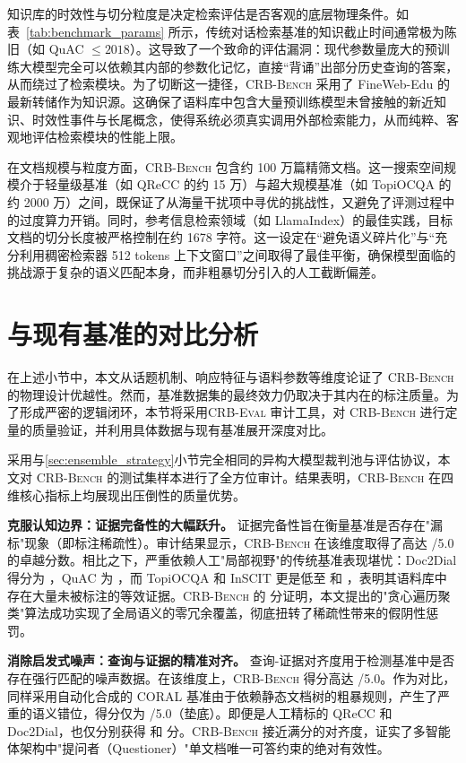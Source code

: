 知识库的时效性与切分粒度是决定检索评估是否客观的底层物理条件。如表~\ref{tab:benchmark_params} 所示，传统对话检索基准的知识截止时间通常极为陈旧（如 QuAC $\leq 2018$）。这导致了一个致命的评估漏洞：现代参数量庞大的预训练大模型完全可以依赖其内部的参数化记忆，直接“背诵”出部分历史查询的答案，从而绕过了检索模块。为了切断这一捷径，\textsc{CRB-Bench} 采用了 FineWeb-Edu 的最新转储作为知识源。这确保了语料库中包含大量预训练模型未曾接触的新近知识、时效性事件与长尾概念，使得系统必须真实调用外部检索能力，从而纯粹、客观地评估检索模块的性能上限。

在文档规模与粒度方面，\textsc{CRB-Bench} 包含约 100 万篇精筛文档。这一搜索空间规模介于轻量级基准（如 QReCC 的约 15 万）与超大规模基准（如 TopiOCQA 的约 2000 万）之间，既保证了从海量干扰项中寻优的挑战性，又避免了评测过程中的过度算力开销。同时，参考信息检索领域（如 LlamaIndex）的最佳实践，目标文档的切分长度被严格控制在约 1678 字符。这一设定在“避免语义碎片化”与“充分利用稠密检索器 512 tokens 上下文窗口”之间取得了最佳平衡，确保模型面临的挑战源于复杂的语义匹配本身，而非粗暴切分引入的人工截断偏差。


\section{与现有基准的对比分析}
\label{sec:bench_audit}

在上述小节中，本文从话题机制、响应特征与语料参数等维度论证了 \textsc{CRB-Bench} 的物理设计优越性。然而，基准数据集的最终效力仍取决于其内在的标注质量。为了形成严密的逻辑闭环，本节将采用\textsc{CRB-Eval} 审计工具，对 \textsc{CRB-Bench} 进行定量的质量验证，并利用具体数据与现有基准展开深度对比。

采用与\ref{sec:ensemble_strategy}小节完全相同的异构大模型裁判池与评估协议，本文对 \textsc{CRB-Bench} 的测试集样本进行了全方位审计。结果表明，\textsc{CRB-Bench} 在四维核心指标上均展现出压倒性的质量优势。

\textbf{克服认知边界：证据完备性的大幅跃升。} 证据完备性旨在衡量基准是否存在"漏标"现象（即标注稀疏性）。审计结果显示，\textsc{CRB-Bench} 在该维度取得了高达 /5.0 的卓越分数。相比之下，严重依赖人工"局部视野"的传统基准表现堪忧：Doc2Dial 得分为 \TBD{}，QuAC 为 \TBD{}，而 TopiOCQA 和 InSCIT 更是低至 \TBD{} 和 \TBD{}，表明其语料库中存在大量未被标注的等效证据。\textsc{CRB-Bench} 的  分证明，本文提出的"贪心遍历聚类"算法成功实现了全局语义的零冗余覆盖，彻底扭转了稀疏性带来的假阴性惩罚。

\textbf{消除启发式噪声：查询与证据的精准对齐。} 查询-证据对齐度用于检测基准中是否存在强行匹配的噪声数据。在该维度上，\textsc{CRB-Bench} 得分高达 /5.0。作为对比，同样采用自动化合成的 CORAL 基准由于依赖静态文档树的粗暴规则，产生了严重的语义错位，得分仅为 /5.0（垫底）。即便是人工精标的 QReCC 和 Doc2Dial，也仅分别获得 \TBD{} 和 \TBD{} 分。\textsc{CRB-Bench} 接近满分的对齐度，证实了多智能体架构中"提问者（Questioner）"单文档唯一可答约束的绝对有效性。


